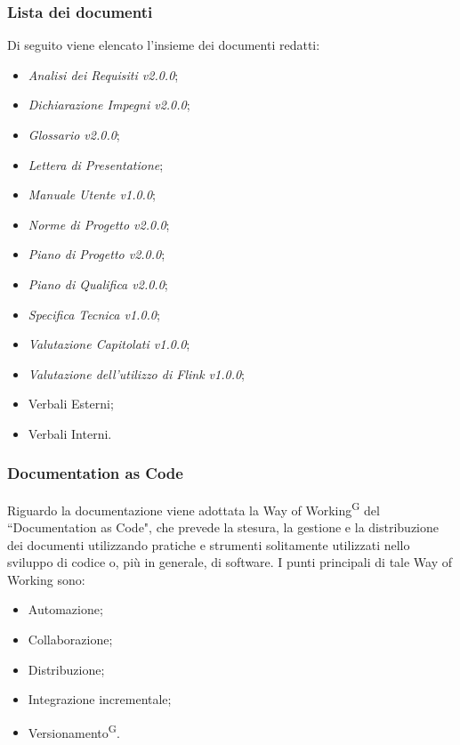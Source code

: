 \documentclass[8pt]{article}
\newcommand{\glossterm}[1]{#1\textsuperscript{G}} %
\begin{document}
\subsubsection{Lista dei documenti}
Di seguito viene elencato l'insieme dei documenti redatti:
\begin{itemize}
    \item \textit{Analisi dei Requisiti v2.0.0};
    \item \textit{Dichiarazione Impegni v2.0.0};
    \item \textit{Glossario v2.0.0};
    \item \textit{Lettera di Presentatione};
    \item \textit{Manuale Utente v1.0.0};
    \item \textit{Norme di Progetto v2.0.0};
    \item \textit{Piano di Progetto v2.0.0};
    \item \textit{Piano di Qualifica v2.0.0};
    \item \textit{Specifica Tecnica v1.0.0};
    \item \textit{Valutazione Capitolati v1.0.0};
    \item \textit{Valutazione dell'utilizzo di Flink v1.0.0};
    \item Verbali Esterni;
    \item Verbali Interni.
\end{itemize}

\subsubsection{Documentation as Code}
Riguardo la documentazione viene adottata la \glossterm{Way of Working} del ``Documentation as
Code", che prevede la stesura, la gestione e la distribuzione dei documenti utilizzando pratiche e strumenti solitamente utilizzati nello sviluppo di codice o, più in generale, di software. I punti principali di tale Way of Working sono:
\begin{itemize}
    \item Automazione;
    \item Collaborazione;
    \item Distribuzione;
    \item Integrazione incrementale;
    \item \glossterm{Versionamento}.
\end{itemize}
\end{document}
